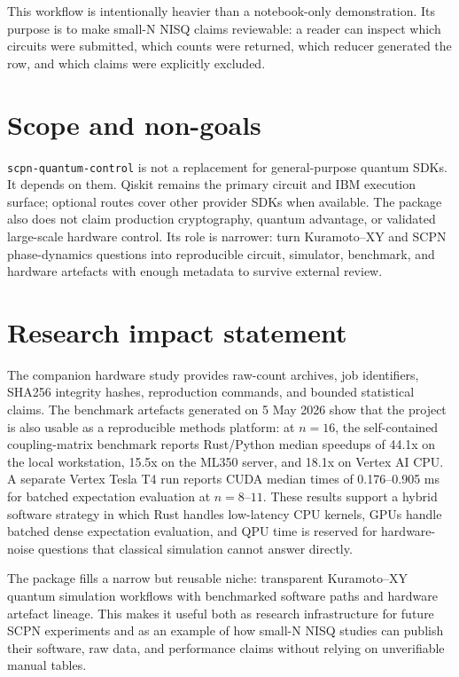 \documentclass[11pt]{article}
\begin{document}
This workflow is intentionally heavier than a notebook-only demonstration. Its
purpose is to make small-N NISQ claims reviewable: a reader can inspect which
circuits were submitted, which counts were returned, which reducer generated
the row, and which claims were explicitly excluded.

\section*{Scope and non-goals}

\texttt{scpn-quantum-control} is not a replacement for general-purpose quantum
SDKs. It depends on them. Qiskit remains the primary circuit and IBM execution
surface; optional routes cover other provider SDKs when available. The package
also does not claim production cryptography, quantum advantage, or validated
large-scale hardware control. Its role is narrower: turn Kuramoto--XY and SCPN
phase-dynamics questions into reproducible circuit, simulator, benchmark, and
hardware artefacts with enough metadata to survive external review.

\section*{Research impact statement}

The companion hardware study provides raw-count archives, job identifiers,
SHA256 integrity hashes, reproduction commands, and bounded statistical claims.
The benchmark artefacts generated on 5 May 2026 show that the project is also
usable as a reproducible methods platform: at $n=16$, the self-contained
coupling-matrix benchmark reports Rust/Python median speedups of 44.1x on the
local workstation, 15.5x on the ML350 server, and 18.1x on Vertex AI CPU. A
separate Vertex Tesla T4 run reports CUDA median times of 0.176--0.905 ms for
batched expectation evaluation at $n=8$--$11$. These results support a hybrid
software strategy in which Rust handles low-latency CPU kernels, GPUs handle
batched dense expectation evaluation, and QPU time is reserved for
hardware-noise questions that classical simulation cannot answer directly.

The package fills a narrow but reusable niche: transparent Kuramoto--XY quantum
simulation workflows with benchmarked software paths and hardware artefact
lineage. This makes it useful both as research infrastructure for future SCPN
experiments and as an example of how small-N NISQ studies can publish their
software, raw data, and performance claims without relying on unverifiable
manual tables.
\end{document}

